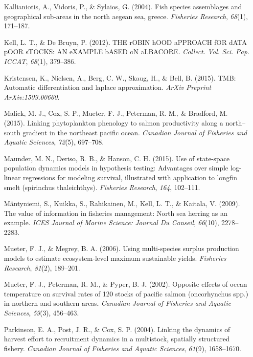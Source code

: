 \documentclass[12pt,]{scrartcl}
\begin{document}
\hypertarget{ref-kallianiotis2004fish}{}
Kallianiotis, A., Vidoris, P., \& Sylaios, G. (2004). Fish species
assemblages and geographical sub-areas in the north aegean sea, greece.
\emph{Fisheries Research}, \emph{68}(1), 171--187.

\hypertarget{ref-kell2012robin}{}
Kell, L. T., \& De Bruyn, P. (2012). THE rOBIN hOOD aPPROACH fOR dATA
pOOR sTOCKS: AN eXAMPLE bASED oN aLBACORE. \emph{Collect. Vol. Sci. Pap.
ICCAT}, \emph{68}(1), 379--386.

\hypertarget{ref-kristensen2015tmb}{}
Kristensen, K., Nielsen, A., Berg, C. W., Skaug, H., \& Bell, B. (2015).
TMB: Automatic differentiation and laplace approximation. \emph{ArXiv
Preprint ArXiv:1509.00660}.

\hypertarget{ref-malick2015linking}{}
Malick, M. J., Cox, S. P., Mueter, F. J., Peterman, R. M., \& Bradford,
M. (2015). Linking phytoplankton phenology to salmon productivity along
a north--south gradient in the northeast pacific ocean. \emph{Canadian
Journal of Fisheries and Aquatic Sciences}, \emph{72}(5), 697--708.

\hypertarget{ref-maunder2015use}{}
Maunder, M. N., Deriso, R. B., \& Hanson, C. H. (2015). Use of
state-space population dynamics models in hypothesis testing: Advantages
over simple log-linear regressions for modeling survival, illustrated
with application to longfin smelt (spirinchus thaleichthys).
\emph{Fisheries Research}, \emph{164}, 102--111.

\hypertarget{ref-mantyniemi2009value}{}
Mäntyniemi, S., Kuikka, S., Rahikainen, M., Kell, L. T., \& Kaitala, V.
(2009). The value of information in fisheries management: North sea
herring as an example. \emph{ICES Journal of Marine Science: Journal Du
Conseil}, \emph{66}(10), 2278--2283.

\hypertarget{ref-mueter2006using}{}
Mueter, F. J., \& Megrey, B. A. (2006). Using multi-species surplus
production models to estimate ecosystem-level maximum sustainable
yields. \emph{Fisheries Research}, \emph{81}(2), 189--201.

\hypertarget{ref-mueter2002opposite}{}
Mueter, F. J., Peterman, R. M., \& Pyper, B. J. (2002). Opposite effects
of ocean temperature on survival rates of 120 stocks of pacific salmon
(oncorhynchus spp.) in northern and southern areas. \emph{Canadian
Journal of Fisheries and Aquatic Sciences}, \emph{59}(3), 456--463.

\hypertarget{ref-parkinson2004linking}{}
Parkinson, E. A., Post, J. R., \& Cox, S. P. (2004). Linking the
dynamics of harvest effort to recruitment dynamics in a multistock,
spatially structured fishery. \emph{Canadian Journal of Fisheries and
Aquatic Sciences}, \emph{61}(9), 1658--1670.
\end{document}
